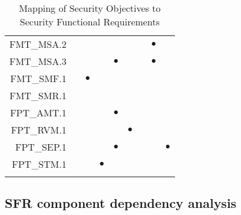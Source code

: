 \documentclass[12pt,english]{scrbook}
\newcommand{\oh}{$\bullet$}
\begin{document}
\begin{longtable}{r|R|R|R|R|R|R|R|R}
FMT\_MSA.2                  &      &              &         &           &          &             &  \oh         &              \\
FMT\_MSA.3                  &      &              &         & \oh       &          &             &  \oh         &              \\
FMT\_SMF.1                  &      &  \oh         &         &           &          &             &              &              \\
FMT\_SMR.1                  &      &              &         &           &          &             &              &              \\
FPT\_AMT.1                  &      &              &         & \oh       &          &             &              &              \\
FPT\_RVM.1                  &      &              &         &           &  \oh     &             &              &              \\
FPT\_SEP.1                  &      &              &         &   \oh     &          &             &              &   \oh        \\
FPT\_STM.1                  &      &              &  \oh    &           &          &             &              &              \\
 \bottomrule
 \caption{Mapping of Security Objectives to Security Functional Requirements}
\end{longtable}

\subsection{SFR component dependency analysis}
\end{document}
